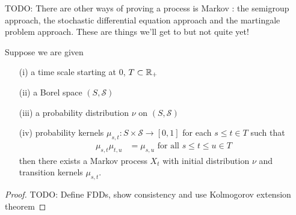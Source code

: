 TODO: There are other ways of proving a process is Markov : the
semigroup approach, the stochastic differential equation approach and
the martingale problem approach.  These are things we'll get to but
not quite yet!

\begin{thm}\label{ExistenceMarkovProcess}Suppose we are given
\begin{itemize}
\item[(i)] a  time scale starting at $0$, $T \subset \mathbb{R}_+$ 
\item[(ii)]a Borel space $(S, \mathcal{S})$ 
\item[(iii)]a probability distribution $\nu$ on $(S, \mathcal{S})$
\item[(iv)]probability kernels $\mu_{s,t} : S \times
  \mathcal{S} \to [0,1]$ for each $s \leq t \in T$ such that 
\begin{align*}
\mu_{s,t} \mu_{t,u} &= \mu_{s,u} \text{ for all $s\leq
  t\leq u \in T$}
\end{align*}
then there exists a Markov process $X_t$ with initial distribution
$\nu$ and transition kernels $\mu_{s,t}$.
\end{itemize} 
\end{thm}
\begin{proof}
TODO: Define FDDs, show consistency and use Kolmogorov extension theorem
\end{proof}

